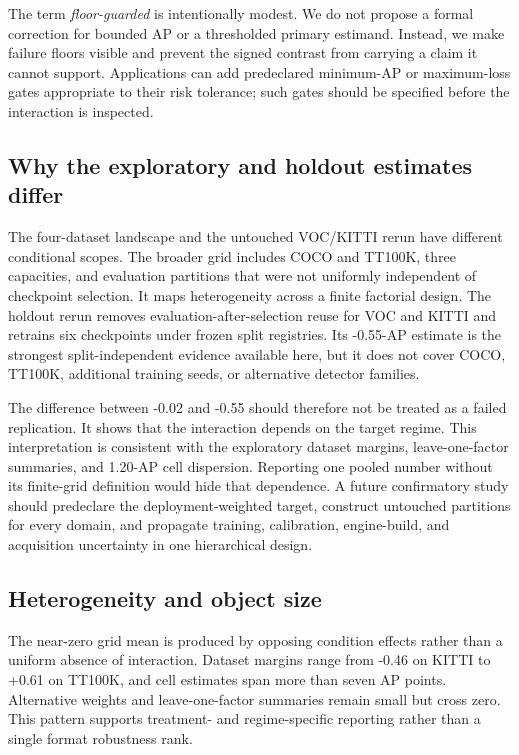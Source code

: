 The term \emph{floor-guarded} is intentionally modest. We do not propose a
formal correction for bounded AP or a thresholded primary estimand. Instead, we
make failure floors visible and prevent the signed contrast from carrying a
claim it cannot support. Applications can add predeclared minimum-AP or
maximum-loss gates appropriate to their risk tolerance; such gates should be
specified before the interaction is inspected.

\subsection{Why the exploratory and holdout estimates differ}

The four-dataset landscape and the untouched VOC/KITTI rerun have different
conditional scopes. The broader grid includes COCO and TT100K, three capacities,
and evaluation partitions that were not uniformly independent of checkpoint
selection. It maps heterogeneity across a finite factorial design. The holdout
rerun removes evaluation-after-selection reuse for VOC and KITTI and retrains
six checkpoints under frozen split registries. Its -0.55-AP estimate is the
strongest split-independent evidence available here, but it does not cover COCO,
TT100K, additional training seeds, or alternative detector families.

The difference between -0.02 and -0.55 should therefore not be treated as a
failed replication. It shows that the interaction depends on the target regime.
This interpretation is consistent with the exploratory dataset margins,
leave-one-factor summaries, and 1.20-AP cell dispersion. Reporting one pooled
number without its finite-grid definition would hide that dependence. A future
confirmatory study should predeclare the deployment-weighted target, construct
untouched partitions for every domain, and propagate training, calibration,
engine-build, and acquisition uncertainty in one hierarchical design.

\subsection{Heterogeneity and object size}

The near-zero grid mean is produced by opposing condition effects rather than a
uniform absence of interaction. Dataset margins range from -0.46 on KITTI to
+0.61 on TT100K, and cell estimates span more than seven AP points. Alternative
weights and leave-one-factor summaries remain small but cross zero. This pattern
supports treatment- and regime-specific reporting rather than a single format
robustness rank.

